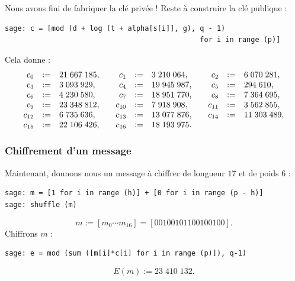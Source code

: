\documentclass[a4paper, titlepage, 11pt]{article}
\theoremstyle{definition}
\theoremstyle{remark}
\begin{document}
Nous avons fini de fabriquer la clé privée ! Reste à construire la clé publique :
\begin{verbatim}
sage: c = [mod (d + log (t + alpha[s[i]], g), q - 1)
                                              for i in range (p)]
\end{verbatim}
Cela donne :
$$\begin{array}{r c l c r c l c r c l}
c_0 &:=& 21\;667\;185, &&
c_1 &:=& 3\;210\;064, &&
c_2 &:=& 6\;070\;281, \\
c_3 &:=& 3\;093\;929, &&
c_4 &:=& 19\;945\;987, &&
c_5 &:=& 294\;610, \\
c_6 &:=& 4\;230\;580, &&
c_7 &:=& 18\;951\;770, &&
c_8 &:=& 7\;364\;695, \\
c_9 &:=& 23\;348\;812, &&
c_{10} &:=& 7\;918\;908, &&
c_{11} &:=& 3\;562\;855, \\
c_{12} &:=& 6\;735\;636, &&
c_{13} &:=& 13\;077\;876, &&
c_{14} &:=& 11\;303\;489, \\
c_{15} &:=& 22\;106\;426, &&
c_{16} &:=& 18\;193\;975.
\end{array}$$


\subsubsection{Chiffrement d'un message}
Maintenant, donnons nous un message à chiffrer de longueur $17$ et de poids $6$ :
\begin{verbatim}
sage: m = [1 for i in range (h)] + [0 for i in range (p - h)]
sage: shuffle (m)
\end{verbatim}
$$m := [m_0\cdots m_{16}] = [00100101100100100].$$
Chiffrons $m$ :
\begin{verbatim}
sage: e = mod (sum ([m[i]*c[i] for i in range (p)]), q-1)
\end{verbatim}
$$E(m) := 23\;410\;132.$$
\end{document}
